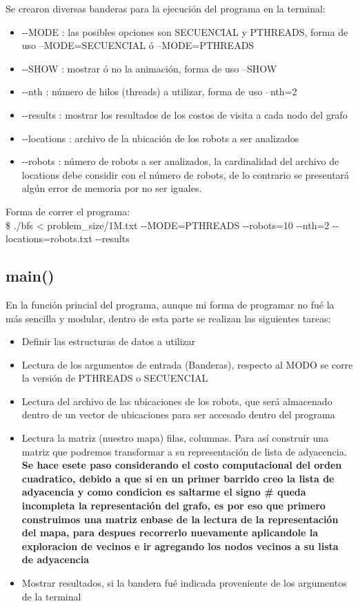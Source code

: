 \documentclass[oneside,twocolumn]{article}
\begin{document}
Se crearon diversas banderas para la ejecución del programa en la terminal:

\begin{itemize}
\item -{}-MODE : las posibles opciones son SECUENCIAL y PTHREADS, forma de uso --MODE=SECUENCIAL ó --MODE=PTHREADS
\item -{}-SHOW : mostrar ó no la animación, forma de uso --SHOW
\item -{}-nth  : número de hilos (threads) a utilizar, forma de uso --nth=2
\item -{}-results : mostrar los resultados de los costos de visita a cada nodo del grafo
\item -{}-locations : archivo de la ubicación de los robots a ser analizados
\item -{}-robots : número de robots a ser analizados, la cardinalidad del archivo de locations debe considir con el número de robots, de lo contrario se presentará algún error de memoria por no ser iguales.  
\end{itemize}

Forma de correr el programa: \\

 \$ ./bfs < problem\_size/1M.txt -{}-MODE=PTHREADS -{}-robots=10 -{}-nth=2 -{}-locations=robots.txt -{}-results 

\subsection{main()}

En la función princial del programa, aunque mi forma de programar no fué la más sencilla y modular, dentro de esta parte se realizan las siguientes tareas:

\begin{itemize}
\item Definir las estructuras de datos a utilizar
\item Lectura de los argumentos de entrada (Banderas), respecto al MODO se corre la versión de PTHREADS o SECUENCIAL
\item Lectura del archivo de las ubicaciones de los robots, que será almacenado dentro de un vector de ubicaciones para ser accesado dentro del programa
\item Lectura la matriz (nuestro mapa) filas, columnas. Para así construir una matriz que podremos transformar a su representación de lista de adyacencia. \textbf{Se hace esete paso considerando el costo computacional del orden cuadratico, debido a que si en un primer barrido creo la lista de adyacencia y como condicion es saltarme el signo \# queda incompleta la representación del grafo, es por eso que primero construimos una matriz enbase de la lectura de la representación del mapa, para despues recorrerlo nuevamente aplicandole la exploracion de vecinos e ir agregando los nodos vecinos a su lista de adyacencia}
\item Mostrar resultados, si la bandera fué indicada proveniente de los argumentos de la terminal
\end{itemize}
\end{document}
